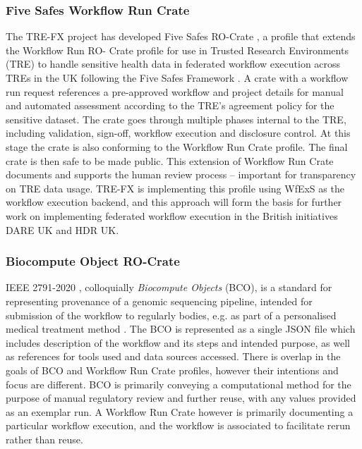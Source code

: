 \subsubsection{Five Safes Workflow Run Crate}\label{ch54:trusted-workflow-run-crate}

The TRE-FX project  has developed Five Safes RO-Crate , a profile that extends the Workflow Run RO- Crate profile for use in Trusted Research Environments (TRE) to handle sensitive health data in federated workflow execution across TREs in the UK following the Five Safes Framework \cite{Desai 2016}.
A crate with a workflow run request references a pre-approved workflow and project details for manual and automated assessment according to the TRE's agreement policy for the sensitive dataset. 
The crate goes through multiple phases internal to the TRE, including validation, sign-off, workflow execution and disclosure control.
At this stage the crate is also conforming to the Workflow Run Crate profile.
The final crate is then safe to be made public.
This extension of Workflow Run Crate documents and supports the human review process -- important for transparency on TRE data usage. 
TRE-FX is implementing this profile using WfExS as the workflow execution backend, and this approach will form the basis for further work on implementing federated workflow execution in the British initiatives DARE UK and HDR UK.    


\subsubsection{Biocompute Object RO-Crate}\label{ch54:bco-crate}
IEEE 2791-2020 \cite{ieee2791}, colloquially \emph{Biocompute Objects} (BCO), is a standard for representing provenance of a genomic sequencing pipeline, intended for submission of the workflow to regularly bodies, e.g. as part of a personalised medical treatment method \cite{Alterovitz 2018}. 
The BCO is represented as a single JSON file which includes description of the workflow and its steps and intended purpose, as well as references for tools used and data sources accessed. 
There is overlap in the goals of BCO and Workflow Run Crate profiles, however their intentions and focus are different. 
BCO is primarily conveying a computational method for the purpose of manual regulatory review and further reuse, with any values provided as an exemplar run.  
A Workflow Run Crate however is primarily documenting a particular workflow execution, and the workflow is associated to facilitate rerun rather than reuse. 


